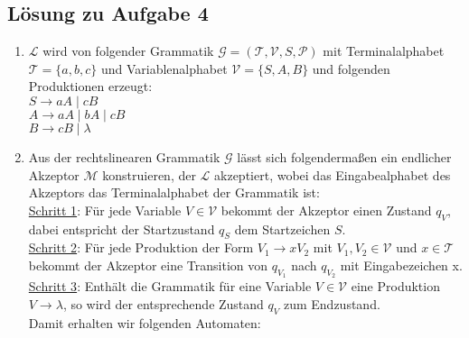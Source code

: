 \documentclass[10pt,oneside,onecolumn,a4paper,german,titlepage]{article}
\begin{document}
\subsection*{Lösung zu Aufgabe 4}
\begin{enumerate}
\item $\mathcal{L}$ wird von folgender Grammatik $\mathcal{G} = (\mathcal{T},\mathcal{V},
S,\mathcal{P})$ mit Terminalalphabet $\mathcal{T} = \{a,b,c\}$ und
Variablenalphabet $\mathcal{V} = \{S,A,B\}$ und folgenden Produktionen erzeugt:\\
$S \rightarrow aA \; | \; cB$\\
$A \rightarrow aA \; | \; bA \; | \; cB$\\
$B \rightarrow cB \; | \; \lambda$
\item Aus der rechtslinearen Grammatik $\mathcal{G}$ lässt sich folgendermaßen ein
endlicher Akzeptor $\mathcal{M}$ konstruieren, der $\mathcal{L}$ akzeptiert, wobei
das Eingabealphabet des Akzeptors das Terminalalphabet der Grammatik ist:\\
\underline{Schritt 1}: Für jede Variable $V \in \mathcal{V}$ bekommt der Akzeptor
einen Zustand $q_V$, dabei entspricht der Startzustand $q_S$ dem Startzeichen $S$.\\
\underline{Schritt 2}: Für jede Produktion der Form $V_1 \rightarrow xV_2$ mit
$V_1,V_2 \in \mathcal{V}$ und $x \in \mathcal{T}$ bekommt der Akzeptor eine
Transition von $q_{V_1}$ nach $q_{V_2}$ mit Eingabezeichen x.\\
\underline{Schritt 3}: Enthält die Grammatik für eine Variable $V \in \mathcal{V}$
eine Produktion $V \rightarrow \lambda$, so wird der entsprechende Zustand $q_V$
zum Endzustand.\\
Damit erhalten wir folgenden Automaten:
\begin{center}
\end{center}
\end{enumerate}
\end{document}
